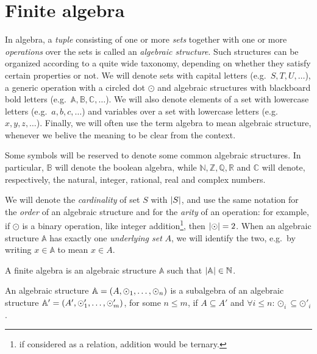 \section{Finite algebra}\label{sec:prime_fields}
In algebra, a \emph{tuple} consisting of one or more \emph{sets} together with one or more 
\emph{operations} over the sets is called an \emph{algebraic structure}.
Such structures can be organized according to a quite wide taxonomy, depending on whether 
they satisfy certain properties or not. 
We will denote sets with capital letters (e.g.\  \(S, T, U, \dots \)), a generic operation with a 
circled dot \(\odot \) and algebraic structures with blackboard bold letters 
(e.g.\  \(\mathbb{A}, \mathbb{B}, \mathbb{C}, \dots \)).
We will also denote elements of a set with lowercase letters (e.g.\  \(a, b, c, \dots \)) and 
variables over a set with lowercase letters (e.g.\  \(x, y, z, \dots \)).
Finally, we will often use the term algebra to mean algebraic structure, whenever we belive the 
meaning to be clear from the context.
\begin{remark}
  Some symbols will be reserved to denote some common algebraic structures. 
  In particular, \(\mathbb{B}\) will denote the boolean algebra, while \(\mathbb{N}, \mathbb{Z}, 
  \mathbb{Q}, \mathbb{R}\) and \(\mathbb{C}\) will denote, respectively, the 
  natural, integer, rational, real and complex numbers.
\end{remark}

We will denote the \emph{cardinality} of set \(S\) with \(\left\lvert S\right\rvert\), and use the same notation for the \emph{order} of an algebraic structure and for the \emph{arity} of an operation: for example, if \(\odot \) is a binary operation, like integer 
addition\footnote{if considered as a relation, addition would be ternary.}, then 
\(\left\lvert\odot\right\rvert = 2\).
When an algebraic structure \(\mathbb{A}\) has exactly one \emph{underlying set} \(A\), we will identify the two, e.g.\ by writing \(x \in \mathbb{A}\) to mean \(x \in A\).

\begin{definition}
  A finite algebra is an algebraic structure \(\mathbb{A}\) such that \(\left\lvert\mathbb{A}\right\rvert \in \mathbb{N}\).
\end{definition}
\begin{definition}[Subalgebra]
  An algebraic structure \(\mathbb{A} = \left(A, \odot_1, \dots, \odot_n\right)\) is a subalgebra of an algebraic structure \(\mathbb{A}' = \left(A', \odot'_1, \dots, \odot'_m\right)\), for some \(n \le m\), if \(A \subseteq A'\) and \(\forall i \le n\colon \odot_i \subseteq \odot'_i\).
\end{definition}

